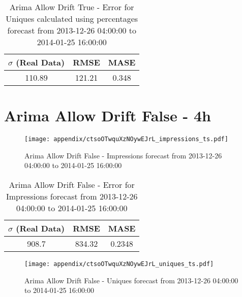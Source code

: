\begin{table}[H]
\centering
\footnotesize
\begin{tabular}{ccc}
$\sigma$ (Real Data) & RMSE & MASE   \\ \hline
110.89 & 121.21 & 0.348 \\
\end{tabular}

\vspace{0.5cm}

\caption{
Arima Allow Drift True - Error for Uniques calculated using percentages forecast from 2013-12-26 04:00:00 to 2014-01-25 16:00:00}
\end{table}

\section{Arima Allow Drift False - 4h}
\begin{figure}[H] \begin{center} \leavevmode
\texttt{[image: appendix/ctsoOTwquXzNOywEJrL\_impressions\_ts.pdf]} \caption{
Arima Allow Drift False - Impressions forecast from 2013-12-26 04:00:00 to 2014-01-25 16:00:00} \label{fig:appendix/ctsoOTwquXzNOywEJrL_impressions_ts.pdf} \end{center}
\end{figure}

\begin{table}[H]
\centering
\footnotesize
\begin{tabular}{ccc}
$\sigma$ (Real Data) & RMSE & MASE   \\ \hline
908.7 & 834.32 & 0.2348 \\
\end{tabular}

\vspace{0.5cm}

\caption{
Arima Allow Drift False - Error for Impressions forecast from 2013-12-26 04:00:00 to 2014-01-25 16:00:00}
\end{table}

\begin{figure}[H] \begin{center} \leavevmode
\texttt{[image: appendix/ctsoOTwquXzNOywEJrL\_uniques\_ts.pdf]} \caption{
Arima Allow Drift False - Uniques forecast from 2013-12-26 04:00:00 to 2014-01-25 16:00:00} \label{fig:appendix/ctsoOTwquXzNOywEJrL_uniques_ts.pdf} \end{center}
\end{figure}

